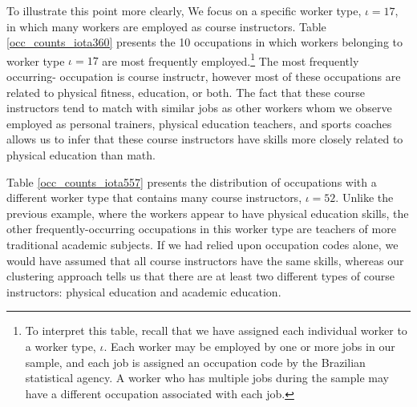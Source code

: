 \documentclass[12pt]{article}
\def\i{\iota}
\theoremstyle{definition}
\theoremstyle{plain}
\begin{document}

To illustrate this point more clearly, We focus on a specific worker type, $\i=17$, in which many workers are employed as course instructors. Table \ref{occ_counts_iota360} presents the 10 occupations in which workers belonging to worker type $\i=17$ are most frequently employed.\footnote{To interpret this table, recall that we have assigned each individual worker to a worker type, $\i$. Each worker may be employed by one or more jobs in our sample, and each job is assigned an occupation code by the Brazilian statistical agency. A worker who has multiple jobs during the sample may have a different occupation associated with each job.}  The most frequently occurring- occupation is course instructr, however most of these occupations are related to physical fitness, education, or both. The fact that these course instructors tend to match with similar jobs as other workers whom we observe employed as personal trainers, physical education teachers, and sports coaches allows us to infer that these course instructors have skills more closely related to physical education than math. 

Table \ref{occ_counts_iota557} presents the distribution of occupations with a different worker type that contains many course instructors, $\i=52$. Unlike the previous example, where the workers appear to have physical education skills, the other frequently-occurring occupations in this worker type are teachers of more traditional academic subjects. If we had relied upon occupation codes alone, we would have assumed that all course instructors have the same skills, whereas our clustering approach tells us that there are at least two different types of course instructors: physical education and academic education.
\end{document}
